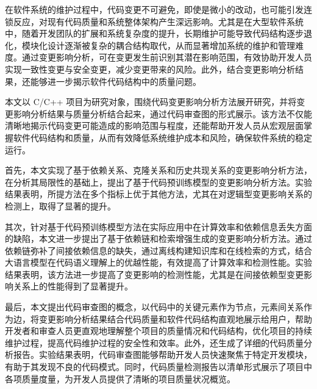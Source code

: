 \begin{cabstract}

在软件系统的维护过程中，代码变更不可避免，即使是微小的改动，也可能引发连锁反应，对现有代码质量和系统整体架构产生深远影响。尤其是在大型软件系统中，随着开发团队的扩展和系统复杂度的提升，长期维护可能导致代码结构逐步退化，模块化设计逐渐被复杂的耦合结构取代，从而显著增加系统的维护和管理难度。通过变更影响分析，可在变更发生前识别其潜在影响范围，有效协助开发人员实现一致性变更与安全变更，减少变更带来的风险。此外，结合变更影响分析结果，还能够进一步揭示软件代码结构中的质量问题。

本文以 C/C++ 项目为研究对象，围绕代码变更影响分析方法展开研究，并将变更影响分析结果与质量分析结合起来，通过代码审查图的形式展示。该方法不仅能清晰地揭示代码变更可能造成的影响范围与程度，还能帮助开发人员从宏观层面掌握软件代码结构和质量，从而有效降低系统维护成本和风险，确保软件系统的稳定运行。

首先，本文实现了基于依赖关系、克隆关系和历史共现关系的变更影响分析方法，在分析其局限性的基础上，提出了基于代码预训练模型的变更影响分析方法。实验结果表明，所提方法在多个指标上优于其他方法，尤其在对逻辑型变更影响关系的检测上，取得了显著的提升。

其次，针对基于代码预训练模型方法在实际应用中在计算效率和依赖信息丢失方面的缺陷，本文进一步提出了基于依赖链和检索增强生成的变更影响分析方法。通过依赖链弥补了间接依赖信息的缺失，通过离线构建知识库和在线检索的方式，结合大语言模型在代码语义理解上的优越性能，有效提高了计算效率和检测性能。实验结果表明，该方法进一步提高了变更影响的检测性能，尤其是在间接依赖型变更影响关系上的性能得到了显著提升。

最后，本文提出代码审查图的概念，以代码中的关键元素作为节点，元素间关系作为边，将变更影响分析结果结合代码质量和软件代码结构直观地展示给用户，帮助开发者和审查人员更直观地理解整个项目的质量情况和代码结构，优化项目的持续维护过程，提高代码维护过程的安全性和效率。此外，还生成了详细的代码质量分析报告。实验结果表明，代码审查图能够帮助开发人员快速聚焦于特定开发模块，有助于其发现不良的代码模式。同时，代码质量检测报告以清单形式展示了项目中各项质量度量，为开发人员提供了清晰的项目质量状况概览。

\end{cabstract}

